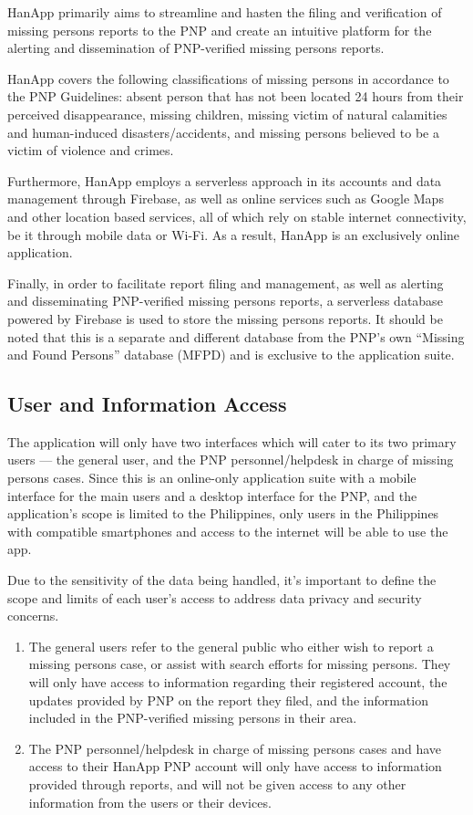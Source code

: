 HanApp primarily aims to streamline and hasten the filing and verification of missing persons reports to the PNP and create an intuitive platform for the alerting and dissemination of PNP-verified missing persons reports.

HanApp covers the following classifications of missing persons in accordance to the PNP Guidelines: absent person that has not been located 24 hours from their perceived disappearance, missing children, missing victim of natural calamities and human-induced disasters/accidents, and missing persons believed to be a victim of violence and crimes.

Furthermore, HanApp employs a serverless approach in its accounts and data management through Firebase, as well as online services such as Google Maps and other location based services, all of which rely on stable internet connectivity, be it through mobile data or Wi-Fi. As a result, HanApp is an exclusively online application.

Finally, in order to facilitate report filing and management, as well as alerting and disseminating PNP-verified missing persons reports, a serverless database powered by Firebase is used to store the missing persons reports. It should be noted that this is a separate and different database from the PNP’s own “Missing and Found Persons” database (MFPD) and is exclusive to the application suite.

\subsection{User and Information Access}
\label{sec:userInfoAcccess}
The application will only have two interfaces which will cater to its two primary users — the general user, and the PNP personnel/helpdesk in charge of missing persons cases. Since this is an online-only application suite with a mobile interface for the main users and a desktop interface for the PNP, and the application’s scope is limited to the Philippines, only users in the Philippines with compatible smartphones and access to the internet will be able to use the app.

Due to the sensitivity of the data being handled, it’s important to define the scope and limits of each user’s access to address data privacy and security concerns.

\begin{enumerate}
    \item The general users refer to the general public who either wish to report a missing persons case, or assist with search efforts for missing persons. They will only have access to information regarding their registered account, the updates provided by PNP on the report they filed, and the information included in the PNP-verified missing persons in their area.
    \item The PNP personnel/helpdesk in charge of missing persons cases and have access to their HanApp PNP account will only have access to information provided through reports, and will not be given access to any other information from the users or their devices.
\end{enumerate}

